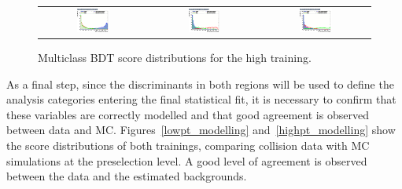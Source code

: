 \begin{figure}[htbp]
  \centering
  \setlength{\tabcolsep}{1.5pt}
  \renewcommand{\arraystretch}{0}
  \begin{tabular}{@{}c c c@{}}
    \includegraphics[width=0.32\textwidth]{images/plots_overtrain_gt200/overtrain_Signal_BDTG.png} &
    \includegraphics[width=0.32\textwidth]{images/plots_overtrain_gt200/overtrain_bkgZ_BDTG.png} &  
    \includegraphics[width=0.32\textwidth]{images/plots_overtrain_gt200/overtrain_bkgtt_BDTG.png}
  \end{tabular}
  \caption{Multiclass BDT score distributions for the high \pth training.}
  \label{highpt_scores}
\end{figure}


As a final step, since the discriminants in both \pth regions will be used to define the analysis categories entering the final statistical fit, it is necessary to confirm that these variables are correctly modelled and that good agreement is observed between data and MC. Figures~\ref{lowpt_modelling} and~\ref{highpt_modelling} show the score distributions of both trainings, comparing collision data with MC simulations at the \ttH preselection level. A good level of agreement is observed between the data and the estimated backgrounds.

